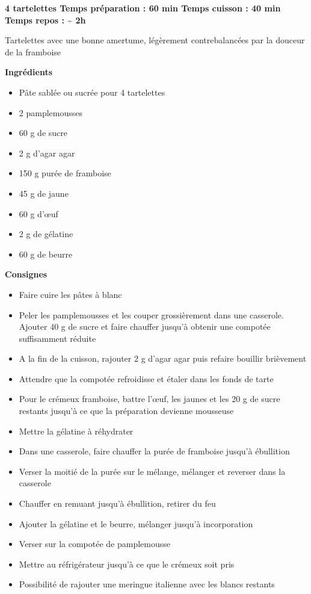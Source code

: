 \documentclass[]{book}
\providecommand{\tightlist}{%
  \setlength{\itemsep}{0pt}\setlength{\parskip}{0pt}}
\begin{document}
\begin{sucrebox}
\textbf{4 tartelettes \textbar{} Temps préparation : 60 min \textbar{}
Temps cuisson : 40 min \textbar{} Temps repos : \textasciitilde{} 2h}

Tartelettes avec une bonne amertume, légèrement contrebalancées par la
douceur de la framboise
\end{sucrebox}

 \textbf{Ingrédients}

\begin{itemize}
\tightlist
\item
  Pâte sablée ou sucrée pour 4 tartelettes
\item
  2 pamplemousses
\item
  60 g de sucre
\item
  2 g d'agar agar
\item
  150 g purée de framboise
\item
  45 g de jaune
\item
  60 g d'œuf
\item
  2 g de gélatine
\item
  60 g de beurre
\end{itemize}

\textbf{Consignes}

\begin{itemize}
\tightlist
\item
  Faire cuire les pâtes à blanc
\item
  Peler les pamplemousses et les couper grossièrement dans une
  casserole. Ajouter 40 g de sucre et faire chauffer jusqu'à obtenir une
  compotée suffisamment réduite
\item
  A la fin de la cuisson, rajouter 2 g d'agar agar puis refaire bouillir
  brièvement
\item
  Attendre que la compotée refroidisse et étaler dans les fonds de tarte
\item
  Pour le crémeux framboise, battre l'œuf, les jaunes et les 20 g de
  sucre restants jusqu'à ce que la préparation devienne mousseuse
\item
  Mettre la gélatine à réhydrater
\item
  Dans une casserole, faire chauffer la purée de framboise jusqu'à
  ébullition
\item
  Verser la moitié de la purée sur le mélange, mélanger et reverser dans
  la casserole
\item
  Chauffer en remuant jusqu'à ébullition, retirer du feu
\item
  Ajouter la gélatine et le beurre, mélanger jusqu'à incorporation
\item
  Verser sur la compotée de pamplemousse
\item
  Mettre au réfrigérateur jusqu'à ce que le crémeux soit pris
\item
  Possibilité de rajouter une meringue italienne avec les blancs
  restants
\end{itemize}
\end{document}
